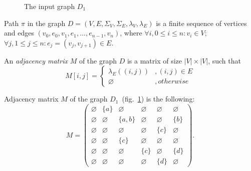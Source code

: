 \begin{figure}[h]
    \centering
    \caption{The input graph $D_1$}
    \label{fig:example_input_graph}
\end{figure}

\begin{definition}
Path $\pi$ in the graph $D=(V, E, \Sigma_V, \Sigma_E, \lambda_V, \lambda_E)$ is a finite sequence of vertices and edges $(v_0, e_0, v_1, e_1, ..., e_{n-1}, v_{n})$, where $\forall i, 0 \leq i \leq n: v_i \in V$; $\forall j, 1 \leq j \leq n: e_j=(v_j, v_{j+1}) \in E$.
\end{definition}

\begin{definition}
An \emph{adjacency matrix} $M$ of the graph $D$ is a matrix of size  $|V|\times|V|$, such that
\begin{equation*}
M[i,j] =
 \begin{cases}
   \lambda_E((i, j))&, (i, j) \in E\\
   \varnothing&, otherwise
 \end{cases}
\end{equation*} 
\end{definition}

Adjacency matrix $M$ of the graph $D_1$~(fig.~\ref{fig:example_input_graph}) is the following:
{
    \renewcommand{\arraystretch}{0.5}
    \setlength\arraycolsep{1.5pt}
$$
    M =
    \begin{pmatrix}
    \varnothing     & \{a\} &   \varnothing      &   \varnothing   &   \varnothing   &   \varnothing   \\
    \varnothing     &   \varnothing   & \{a, b\} &   \varnothing   &    \varnothing  & \{b\} \\
    \varnothing     &   \varnothing   &   \varnothing      &   \varnothing   & \{c\} &   \varnothing   \\
    \varnothing     &   \varnothing   & \{c\}    &   \varnothing   &   \varnothing   &   \varnothing   \\
    \varnothing     &   \varnothing   &   \varnothing      & \{c\} &   \varnothing   & \{d\} \\
    \varnothing     & \varnothing     &   \varnothing      &   \varnothing   & \{d\} &   \varnothing
    \end{pmatrix}.
$$
}

